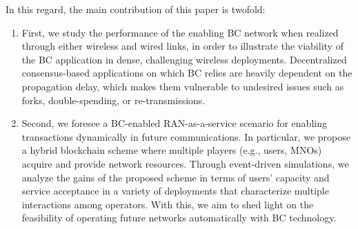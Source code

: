 \documentclass[conference]{IEEEtran}
\theoremstyle{definition}
\begin{document}
In this regard, the main contribution of this paper is twofold:
\begin{enumerate}
    \item First, we study the performance of the enabling BC network when realized through either wireless and wired links, in order to illustrate the viability of the BC application in dense, challenging wireless deployments. Decentralized consensus-based applications on which BC relies are heavily dependent on the propagation delay, which makes them vulnerable to undesired issues such as forks, double-spending, or re-transmissions. %
    \item Second, we foresee a BC-enabled RAN-as-a-service scenario for enabling transactions dynamically in future communications. %
    In particular, we propose a hybrid blockchain scheme where multiple players (e.g., users, MNOs) acquire and provide network resources. Through event-driven simulations, we analyze the gains of the proposed scheme in terms of users' capacity and service acceptance in a variety of deployments that characterize multiple interactions among operators. With this, we aim to shed light on the feasibility of operating future networks automatically with BC technology.
    
\end{enumerate}

%
%
\end{document}
